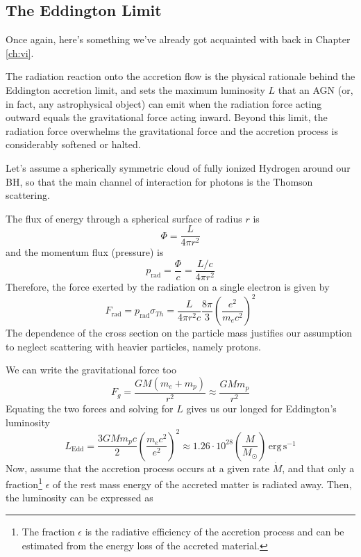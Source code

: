 \subsection{The Eddington Limit}
Once again, here's something we've already got acquainted with back in Chapter \ref{ch:vi}. 
\par The radiation reaction onto the accretion ﬂow is the physical rationale behind the Eddington accretion limit, and sets the maximum luminosity $L$ that an AGN
(or, in fact, any astrophysical object) can emit when the radiation force acting outward equals the gravitational force acting inward. Beyond this limit, the radiation force overwhelms the gravitational force and the accretion process is considerably softened or halted.
\par Let's assume a spherically symmetric cloud of fully ionized Hydrogen around our BH, so that the main channel of interaction for photons is the Thomson scattering.
\par The flux of energy through a spherical surface of radius $r$ is 
\begin{equation*}
    \Phi = \frac{L}{4\pi r^{2}}
\end{equation*}
and the momentum flux (pressure) is
\begin{equation*}
    p_{\text{rad}} = \frac{\Phi}{c} = \frac{L/c}{4\pi r^{2}}
\end{equation*}
Therefore, the force exerted by the radiation on a single electron is given by
\begin{equation*}
    F_{\text{rad}} = p_{\text{rad}}\sigma_{Th} = \frac{L}{4\pi r^{2}c}\frac{8\pi}{3}\left(\frac{e^{2}}{m_{e}c^{2}}\right)^{2}
\end{equation*}
The dependence of the cross section on the particle mass justifies our assumption to neglect scattering with heavier particles, namely protons.
\par We can write the gravitational force too
\begin{equation*}
    F_{g} = \frac{GM(m_{e}+m_{p})}{r^{2}}\approx \frac{GMm_{p}}{r^{2}}
\end{equation*}
Equating the two forces and solving for $L$ gives us our longed for Eddington's luminosity
\begin{equation}
    L_{\text{Edd}} = \frac{3GMm_{p}c}{2}\left(\frac{m_{e}c^{2}}{e^{2}}\right)^{2}\approx 1.26\cdot 10^{28}\left(\frac{M}{M_{\odot}}\right)\,\text{erg}\,\text{s}^{-1}
    \label{eq:eddingtonluminosity}
\end{equation}
Now, assume that the accretion process occurs at a given rate $\dot{M}$, and that only a fraction\footnote{The fraction $\epsilon$ is the radiative eﬃciency of the accretion process and can be estimated from the energy loss of the accreted material.} $\epsilon$ of the rest mass energy of the accreted matter is radiated away. Then, the luminosity can be expressed as
